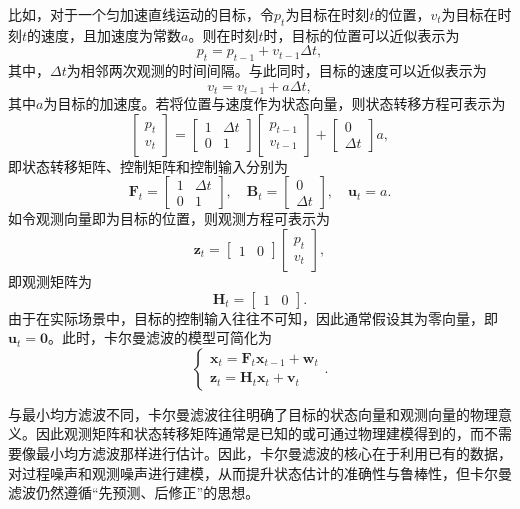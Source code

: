 比如，对于一个匀加速直线运动的目标，令\( p_t \)为目标在时刻\( t \)的位置，\( v_t \)为目标在时刻\( t \)的速度，且加速度为常数\( a \)。则在时刻\( t \)时，目标的位置可以近似表示为
\[
    p_t = p_{t-1} + v_{t-1} \Delta t,
\]
其中，\( \Delta t \)为相邻两次观测的时间间隔。与此同时，目标的速度可以近似表示为
\[
    v_t = v_{t-1} + a \Delta t,
\]
其中\( a \)为目标的加速度。若将位置与速度作为状态向量，则状态转移方程可表示为
\[
    \begin{bmatrix} p_t \\ v_t \end{bmatrix} = \begin{bmatrix} 1 & \Delta t \\ 0 & 1 \end{bmatrix} \begin{bmatrix} p_{t-1} \\ v_{t-1} \end{bmatrix} + \begin{bmatrix} 0 \\ \Delta t \end{bmatrix} a,
\]
即状态转移矩阵、控制矩阵和控制输入分别为
\[
    \mathbf{F}_t = \begin{bmatrix} 1 & \Delta t \\ 0 & 1 \end{bmatrix}, \quad    \mathbf{B}_t = \begin{bmatrix} 0 \\ \Delta t \end{bmatrix}, \quad \bm{u}_t = a.
\]
如令观测向量即为目标的位置，则观测方程可表示为
\[
    \bm{z}_t = \begin{bmatrix} 1 & 0 \end{bmatrix} \begin{bmatrix} p_t \\ v_t \end{bmatrix},
\]
即观测矩阵为
\[
    \mathbf{H}_t = \begin{bmatrix} 1 & 0 \end{bmatrix}.
\]
由于在实际场景中，目标的控制输入往往不可知，因此通常假设其为零向量，即\( \bm{u}_t = \bm{0} \)。此时，卡尔曼滤波的模型可简化为
\[
    \begin{cases}
        \bm{x}_t = \mathbf{F}_t \bm{x}_{t-1} + \bm{w}_t \\
        \bm{z}_t = \mathbf{H}_t \bm{x}_t + \bm{v}_t
    \end{cases}.
\]

与最小均方滤波不同，卡尔曼滤波往往明确了目标的状态向量和观测向量的物理意义。因此观测矩阵和状态转移矩阵通常是已知的或可通过物理建模得到的，而不需要像最小均方滤波那样进行估计。因此，卡尔曼滤波的核心在于利用已有的数据，对过程噪声和观测噪声进行建模，从而提升状态估计的准确性与鲁棒性，但卡尔曼滤波仍然遵循``先预测、后修正''的思想。

